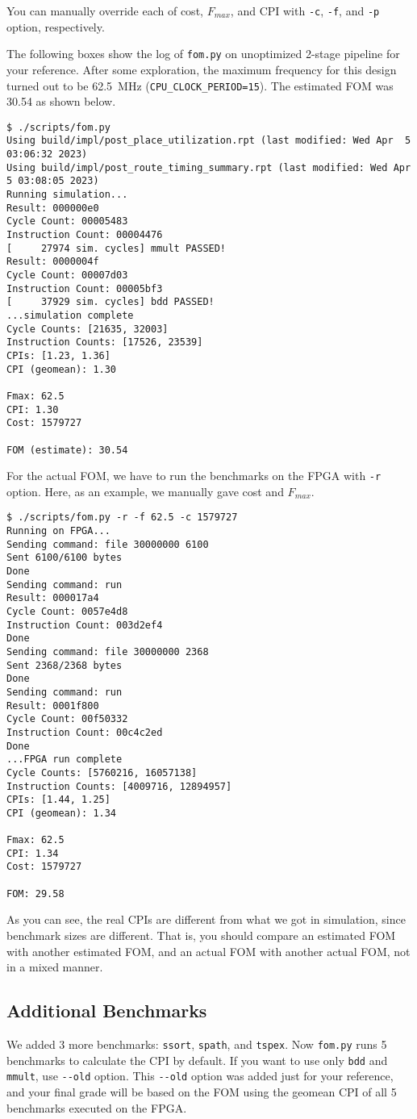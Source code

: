 You can manually override each of cost, $F_{max}$, and CPI with \verb|-c|, \verb|-f|, and \verb|-p| option, respectively.

The following boxes show the log of \verb|fom.py| on unoptimized 2-stage pipeline for your reference.
After some exploration, the maximum frequency for this design turned out to be 62.5~MHz (\verb|CPU_CLOCK_PERIOD=15|).
The estimated FOM was 30.54 as shown below.
\begin{verbatim}
$ ./scripts/fom.py
Using build/impl/post_place_utilization.rpt (last modified: Wed Apr  5 03:06:32 2023)
Using build/impl/post_route_timing_summary.rpt (last modified: Wed Apr  5 03:08:05 2023)
Running simulation...
Result: 000000e0
Cycle Count: 00005483
Instruction Count: 00004476
[     27974 sim. cycles] mmult PASSED!
Result: 0000004f
Cycle Count: 00007d03
Instruction Count: 00005bf3
[     37929 sim. cycles] bdd PASSED!
...simulation complete
Cycle Counts: [21635, 32003]
Instruction Counts: [17526, 23539]
CPIs: [1.23, 1.36]
CPI (geomean): 1.30

Fmax: 62.5
CPI: 1.30
Cost: 1579727

FOM (estimate): 30.54
\end{verbatim}

For the actual FOM, we have to run the benchmarks on the FPGA with \verb|-r| option.
Here, as an example, we manually gave cost and $F_{max}$.
\begin{verbatim}
$ ./scripts/fom.py -r -f 62.5 -c 1579727
Running on FPGA...
Sending command: file 30000000 6100
Sent 6100/6100 bytes
Done
Sending command: run
Result: 000017a4
Cycle Count: 0057e4d8
Instruction Count: 003d2ef4
Done
Sending command: file 30000000 2368
Sent 2368/2368 bytes
Done
Sending command: run
Result: 0001f800
Cycle Count: 00f50332
Instruction Count: 00c4c2ed
Done
...FPGA run complete
Cycle Counts: [5760216, 16057138]
Instruction Counts: [4009716, 12894957]
CPIs: [1.44, 1.25]
CPI (geomean): 1.34

Fmax: 62.5
CPI: 1.34
Cost: 1579727

FOM: 29.58
\end{verbatim}

As you can see, the real CPIs are different from what we got in simulation,
since benchmark sizes are different.
That is, you should compare an estimated FOM with another estimated FOM,
and an actual FOM with another actual FOM, not in a mixed manner.

\subsection{Additional Benchmarks}
We added 3 more benchmarks: \verb|ssort|, \verb|spath|, and \verb|tspex|.
Now \verb|fom.py| runs 5 benchmarks to calculate the CPI by default.
If you want to use only \verb|bdd| and \verb|mmult|, use \verb|--old| option.
This \verb|--old| option was added just for your reference,
and your final grade will be based on the FOM using the geomean CPI of all 5 benchmarks executed on the FPGA.


\newpage
